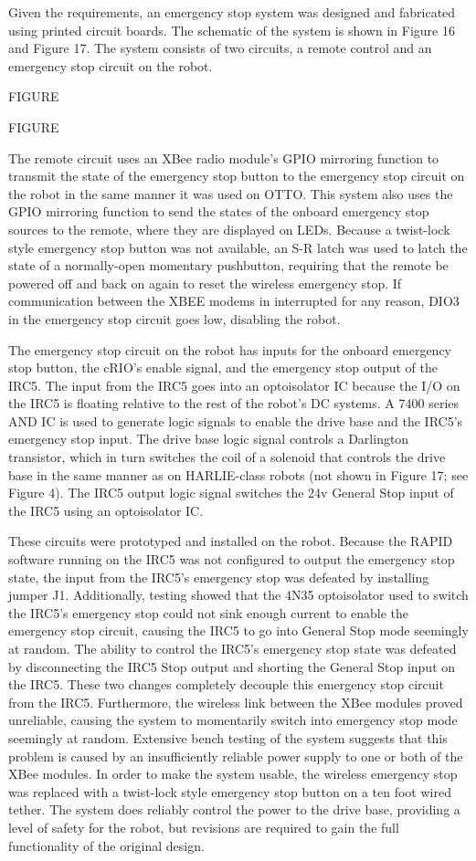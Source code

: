 \documentclass[]{cwru} %
\begin{document}
Given the requirements, an emergency stop system was designed and
fabricated using printed circuit boards. The schematic of the system is
shown in Figure 16 and Figure 17. The system consists of two circuits, a
remote control and an emergency stop circuit on the robot.

FIGURE

FIGURE

The remote circuit uses an XBee radio module's GPIO mirroring function
to transmit the state of the emergency stop button to the emergency stop
circuit on the robot in the same manner it was used on OTTO. This system
also uses the GPIO mirroring function to send the states of the onboard
emergency stop sources to the remote, where they are displayed on LEDs.
Because a twist-lock style emergency stop button was not available, an
S-R latch was used to latch the state of a normally-open momentary
pushbutton, requiring that the remote be powered off and back on again
to reset the wireless emergency stop. If communication between the XBEE
modems in interrupted for any reason, DIO3 in the emergency stop circuit
goes low, disabling the robot.

The emergency stop circuit on the robot has inputs for the onboard
emergency stop button, the cRIO's enable signal, and the emergency stop
output of the IRC5. The input from the IRC5 goes into an optoisolator IC
because the I/O on the IRC5 is floating relative to the rest of the
robot's DC systems. A 7400 series AND IC is used to generate logic
signals to enable the drive base and the IRC5's emergency stop input.
The drive base logic signal controls a Darlington transistor, which in
turn switches the coil of a solenoid that controls the drive base in the
same manner as on HARLIE-class robots (not shown in Figure 17; see
Figure 4). The IRC5 output logic signal switches the 24v General Stop
input of the IRC5 using an optoisolator IC.

These circuits were prototyped and installed on the robot. Because the
RAPID software running on the IRC5 was not configured to output the
emergency stop state, the input from the IRC5's emergency stop was
defeated by installing jumper J1. Additionally, testing showed that the
4N35 optoisolator used to switch the IRC5's emergency stop could not
sink enough current to enable the emergency stop circuit, causing the
IRC5 to go into General Stop mode seemingly at random. The ability to
control the IRC5's emergency stop state was defeated by disconnecting
the IRC5 Stop output and shorting the General Stop input on the IRC5.
These two changes completely decouple this emergency stop circuit from
the IRC5. Furthermore, the wireless link between the XBee modules proved
unreliable, causing the system to momentarily switch into emergency stop
mode seemingly at random. Extensive bench testing of the system suggests
that this problem is caused by an insufficiently reliable power supply
to one or both of the XBee modules. In order to make the system usable,
the wireless emergency stop was replaced with a twist-lock style
emergency stop button on a ten foot wired tether. The system does
reliably control the power to the drive base, providing a level of
safety for the robot, but revisions are required to gain the full
functionality of the original design.
\end{document}
